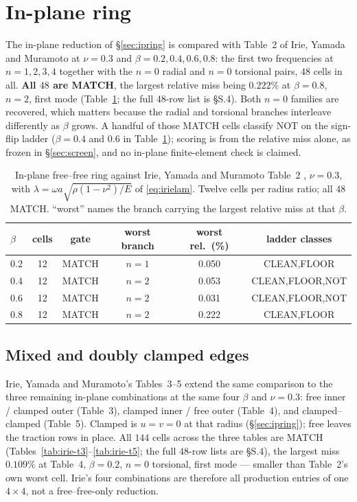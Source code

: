 \documentclass[11pt]{article}
\begin{document}
\FloatBarrier
\section{In-plane ring}\label{sec:inplane}
The in-plane reduction of \S\ref{sec:ipring} is compared with Table~2 of
Irie, Yamada and Muramoto \cite{irie1984} at $\nu=0.3$ and
$\beta=0.2,0.4,0.6,0.8$: the first two frequencies at $n=1,2,3,4$ together
with the $n=0$ radial and $n=0$ torsional pairs, $48$ cells in all.
\textbf{All $48$ are MATCH}, the largest relative miss being $0.222\%$ at
$\beta=0.8$, $n=2$, first mode (Table~\ref{tab:irie}; the full $48$-row list
is \S{}S.4). Both $n=0$ families are recovered, which matters because the
radial and torsional branches interleave differently as $\beta$ grows.
A handful of those MATCH cells classify NOT on the sign-flip ladder
($\beta=0.4$ and $0.6$ in Table~\ref{tab:irie}); scoring is from the relative
miss alone, as frozen in \S\ref{sec:screen}, and no in-plane finite-element
check is claimed.

\begin{table}[htbp]\centering\small
\caption{In-plane free--free ring against Irie, Yamada and Muramoto
Table~2 \cite{irie1984}, $\nu=0.3$, with
$\lambda=\omega a\sqrt{\rho(1-\nu^{2})/E}$ of \eqref{eq:irielam}. Twelve
cells per radius ratio; all $48$ MATCH. ``worst'' names the branch carrying
the largest relative miss at that $\beta$.}
\label{tab:irie}
\begin{tabular}{lccccc}
\toprule
$\beta$ & cells & gate & worst branch & worst rel.\ (\%) & ladder classes\\
\midrule
0.2 & 12 & MATCH & $n=1$ & 0.050 & CLEAN,FLOOR \\
0.4 & 12 & MATCH & $n=2$ & 0.053 & CLEAN,FLOOR,NOT \\
0.6 & 12 & MATCH & $n=2$ & 0.031 & CLEAN,FLOOR,NOT \\
0.8 & 12 & MATCH & $n=2$ & 0.222 & CLEAN,FLOOR \\
\bottomrule
\end{tabular}
\end{table}

\subsection{Mixed and doubly clamped edges}\label{sec:ip-mixed}
Irie, Yamada and Muramoto's Tables~3--5 extend the same comparison to the
three remaining in-plane combinations at the same four $\beta$ and
$\nu=0.3$: free inner / clamped outer (Table~3), clamped inner / free outer
(Table~4), and clamped--clamped (Table~5). Clamped is $u=v=0$ at that radius
(\S\ref{sec:ipring}); free leaves the traction rows in place. All $144$
cells across the three tables are MATCH (Tables~\ref{tab:irie-t3}--\ref{tab:irie-t5};
the full $48$-row lists are \S{}S.4), the largest miss $0.109\%$ at Table~4,
$\beta=0.2$, $n=0$ torsional, first mode --- smaller than Table~2's own worst
cell. Irie's four combinations are therefore all production entries of one
$4\times4$, not a free--free-only reduction.
\end{document}
